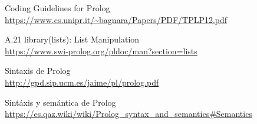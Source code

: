 \documentclass[letterpaper,11pt]{article}
\begin{document}
\begin{thebibliography}{10}
    Coding Guidelines for Prolog \\ 
    \url{https://www.cs.unipr.it/~bagnara/Papers/PDF/TPLP12.pdf}

    A.21 library(lists): List Manipulation \\
    \url{https://www.swi-prolog.org/pldoc/man?section=lists}

    Sintaxis de Prolog \\
    \url{http://gpd.sip.ucm.es/jaime/pl/prolog.pdf}

    Sintáxis y semántica de Prolog \\
    \url{https://es.qaz.wiki/wiki/Prolog_syntax_and_semantics#Semantics}
\end{thebibliography}
\end{document}
